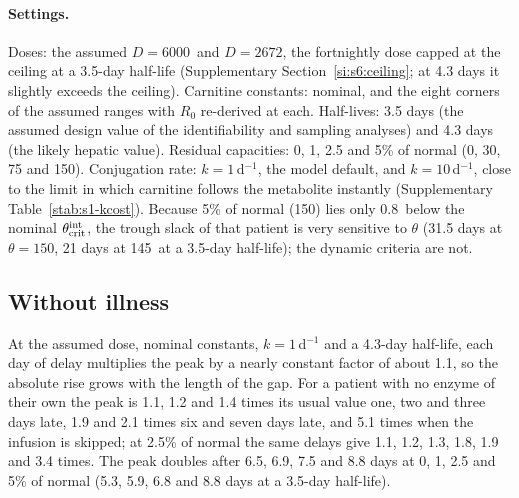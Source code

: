 \paragraph{Settings.} Doses: the assumed $D=6000$\um\ and $D=2672$\um, the fortnightly dose capped at
the ceiling at a 3.5-day half-life (Supplementary Section~\ref{si:s6:ceiling}; at 4.3 days it slightly
exceeds the ceiling). Carnitine constants: nominal, and the eight corners of the assumed ranges with
$R_0$ re-derived at each. Half-lives: 3.5 days (the assumed design value of the identifiability and
sampling analyses) and 4.3 days (the likely hepatic value). Residual capacities: 0, 1, 2.5 and 5\% of normal
(0, 30, 75 and 150\um). Conjugation rate: $k=1$\,d$^{-1}$, the model default, and $k=10$\,d$^{-1}$,
close to the limit in which carnitine follows the metabolite instantly (Supplementary
Table~\ref{stab:s1-kcost}). Because 5\% of normal (150\um) lies only 0.8\um\ below the nominal
$\theta_{\mathrm{crit}}^{\mathrm{int}}$, the trough slack of that patient is very sensitive to $\theta$ (31.5 days at $\theta=150$\um,
21 days at 145\um\ at a 3.5-day half-life); the dynamic criteria are not.

\subsection{Without illness}
\label{si:s7:noill}

At the assumed dose, nominal constants, $k=1$\,d$^{-1}$ and a 4.3-day half-life, each day of delay
multiplies the peak by a nearly constant factor of about 1.1, so the absolute rise grows with the
length of the gap.
For a patient with no enzyme of their own the peak is 1.1, 1.2 and 1.4 times its usual value one, two
and three days late, 1.9 and 2.1 times six and seven days late, and 5.1 times when the infusion is
skipped; at 2.5\% of normal the same delays give 1.1, 1.2, 1.3, 1.8, 1.9 and 3.4 times. The peak
doubles after 6.5, 6.9, 7.5 and 8.8 days at 0, 1, 2.5 and 5\% of normal (5.3, 5.9, 6.8 and 8.8 days at
a 3.5-day half-life).

